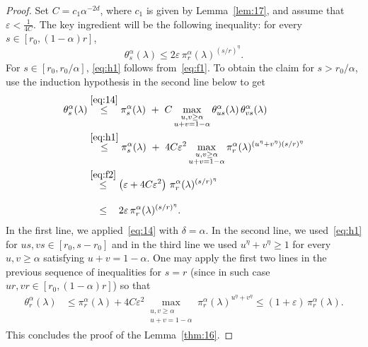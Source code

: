 \documentclass[AHL,Unicode,longabstracts]{cedram}
\newcommand{\ep}{\varepsilon}
\begin{document}
\begin{proof}
Set $C=c_1\alpha^{-2d}$, where $c_1$ is given by Lemma~\ref{lem:17}, and assume that $\ep<\tfrac1{4C}$. The key ingredient will be the following inequality: for every $s\in[r_0,(1-\alpha)r]$,
\begin{equation}\label{eq:h1}
\theta_s^\alpha(\lambda)\le 2\ep\, \pi_r^\alpha(\lambda)^{(s/r)^\eta}.
\end{equation}
For $s\in[r_0,r_0/\alpha]$, \eqref{eq:h1} follows from~\eqref{eq:f1}. To obtain the claim for $s> r_0/\alpha$, use the induction hypothesis in the second line below to get
\begin{align*}
\theta^\alpha_s(\lambda)&\stackrel{{\eqref{eq:14}}}\le \pi_s^\alpha(\lambda)~+~C \max_{\substack{u,v\ge \alpha \\ u+v=1-\alpha}}\theta^\alpha_{us}(\lambda)\,\theta^\alpha_{vs}(\lambda)\\
&\stackrel{\eqref{eq:h1}}\le \pi_s^\alpha(\lambda)~+~4C\ep^2 \max_{\substack{u,v\ge\alpha \\ u+v=1-\alpha}}\pi^\alpha_r(\lambda)^{(u^\eta+v^\eta)(s/r)^\eta}\\
&\stackrel{\eqref{eq:f2}}\le \left(\ep+4C\ep^2\right)\, \pi_r^\alpha(\lambda)^{(s/r)^\eta}\\
&\stackrel{\phantom{\eqref{eq:f2}}}\le 2\ep\,\pi_r^\alpha(\lambda)^{(s/r)^\eta}.
\end{align*}
In the first line, we applied~\eqref{eq:14} with $\delta=\alpha$. In the second line, we used~\eqref{eq:h1} for $us,vs\in[r_0,s-r_0]$ and in the third line we used $u^\eta+v^\eta\ge 1$ for every $u,v\ge\alpha$ satisfying $u+v=1-\alpha$. One may apply the first two lines in the previous sequence of inequalities for $s=r$ (since in such case $ur,vr\in[r_0,(1-\alpha)r]$) so that
\begin{align*}
\theta^\alpha_r(\lambda)&
\le \pi_r^\alpha(\lambda)+4C\ep^2 \max_{\substack{u,v\ge\alpha \\ u+v=1-\alpha}}\pi^\alpha_r(\lambda)^{u^\eta+v^\eta}\le (1+\ep)\, \pi_r^\alpha(\lambda).
\end{align*}
This concludes the proof of the Lemma~\ref{thm:16}.
\end{proof}
\end{document}
